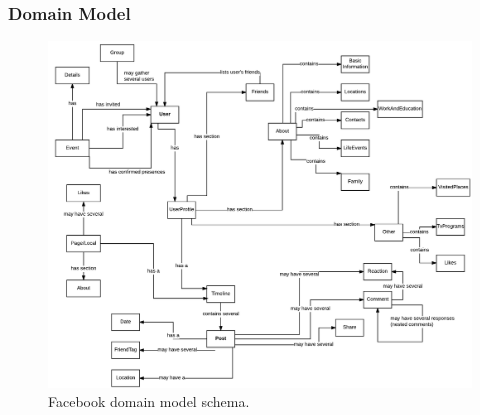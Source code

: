 \subsubsection*{Domain Model}

\begin{figure}[h!]
  \hspace*{-1in}
  \includegraphics[width=1.28\textwidth]{img/facebook-domain-model.png}
\caption{\label{img:fbdomain} Facebook domain model schema.}
\end{figure}

